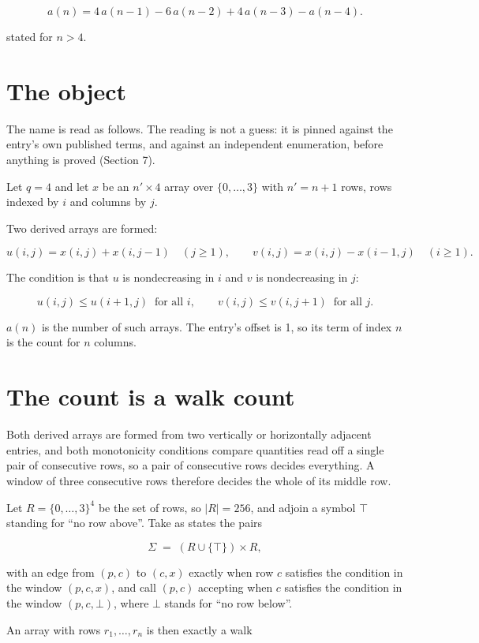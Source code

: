 \documentclass[11pt]{article}
\theoremstyle{definition}
\begin{document}
\[a(n) = 4\,a(n-1) - 6\,a(n-2) + 4\,a(n-3) - a(n-4).\]

stated for $n > 4$.

\section{The object}

The name is read as follows. The reading is not a guess: it is pinned against the entry's own published terms, and against an independent enumeration, before anything is proved (Section 7).

Let $q = 4$ and let $x$ be an $n' \times 4$ array over $\{0,\dots,3\}$ with $n' = n + 1$ rows, rows indexed by $i$ and columns by $j$.

Two derived arrays are formed:

\[u(i,j) = x(i,j) + x(i,j{-}1)\quad (j \ge 1), \qquad v(i,j) = x(i,j) - x(i{-}1,j)\quad (i \ge 1).\]

The condition is that $u$ is nondecreasing in $i$ and $v$ is nondecreasing in $j$:

\[u(i,j) \le u(i{+}1,j) \ \text{ for all } i, \qquad v(i,j) \le v(i,j{+}1) \ \text{ for all } j.\]

$a(n)$ is the number of such arrays. The entry's offset is 1, so its term of index $n$ is the count for $n$ columns.

\section{The count is a walk count}

Both derived arrays are formed from two vertically or horizontally adjacent entries, and both monotonicity conditions compare quantities read off a single pair of consecutive rows, so a pair of consecutive rows decides everything. A window of three consecutive rows therefore decides the whole of its middle row.

Let $R = \{0,\dots,3\}^{4}$ be the set of rows, so $|R| = 256$, and adjoin a symbol $\top$ standing for ``no row above''. Take as states the pairs

\[\Sigma \;=\; (R \cup \{\top\}) \times R,\]

with an edge from $(p,c)$ to $(c,x)$ exactly when row $c$ satisfies the condition in the window $(p,c,x)$, and call $(p,c)$ accepting when $c$ satisfies the condition in the window $(p,c,\bot)$, where $\bot$ stands for ``no row below''.

An array with rows $r_1,\dots,r_n$ is then exactly a walk
\end{document}
